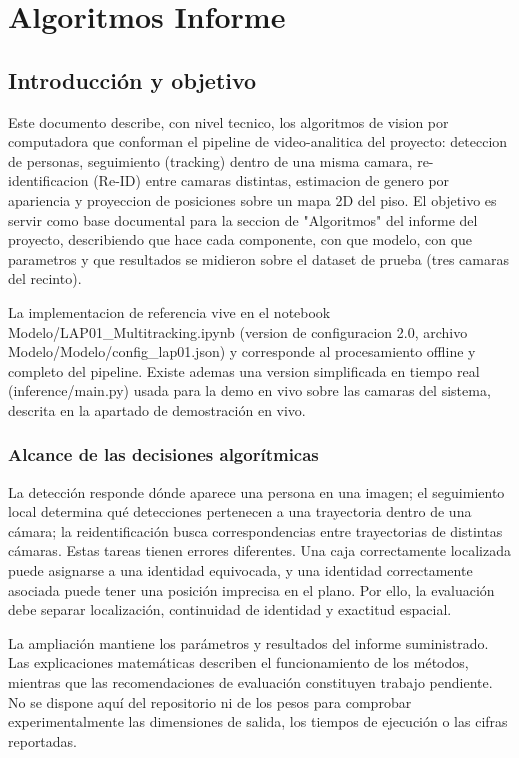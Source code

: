 \documentclass[12pt,letterpaper]{article}
\begin{document}
\section{ Algoritmos Informe}
\subsection{Introducción y objetivo}

Este documento describe, con nivel tecnico, los algoritmos de vision por computadora que conforman el pipeline de video-analitica del proyecto: deteccion de personas, seguimiento (tracking) dentro de una misma camara, re-identificacion (Re-ID) entre camaras distintas, estimacion de genero por apariencia y proyeccion de posiciones sobre un mapa 2D del piso. El objetivo es servir como base documental para la seccion de "Algoritmos" del informe del proyecto, describiendo que hace cada componente, con que modelo, con que parametros y que resultados se midieron sobre el dataset de prueba (tres camaras del recinto).


La implementacion de referencia vive en el notebook Modelo/LAP01\_Multitracking.ipynb (version de configuracion 2.0, archivo Modelo/Modelo/config\_lap01.json) y corresponde al procesamiento offline y completo del pipeline. Existe ademas una version simplificada en tiempo real (inference/main.py) usada para la demo en vivo sobre las camaras del sistema, descrita en la apartado de demostración en vivo.


\subsubsection{Alcance de las decisiones algorítmicas}
La detección responde dónde aparece una persona en una imagen; el seguimiento local determina qué detecciones pertenecen a una trayectoria dentro de una cámara; la reidentificación busca correspondencias entre trayectorias de distintas cámaras. Estas tareas tienen errores diferentes. Una caja correctamente localizada puede asignarse a una identidad equivocada, y una identidad correctamente asociada puede tener una posición imprecisa en el plano. Por ello, la evaluación debe separar localización, continuidad de identidad y exactitud espacial.

La ampliación mantiene los parámetros y resultados del informe suministrado. Las explicaciones matemáticas describen el funcionamiento de los métodos, mientras que las recomendaciones de evaluación constituyen trabajo pendiente. No se dispone aquí del repositorio ni de los pesos para comprobar experimentalmente las dimensiones de salida, los tiempos de ejecución o las cifras reportadas.
\end{document}

